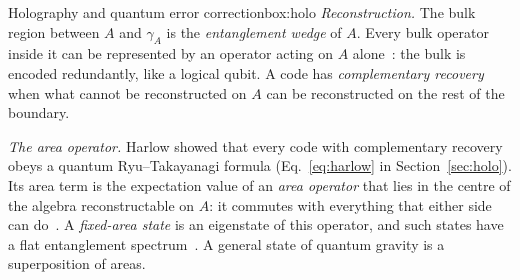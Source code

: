 \begin{primer}{Holography and quantum error correction}{box:holo}
\emph{Reconstruction.} The bulk region between $A$ and $\gamma_A$ is the \emph{entanglement wedge} of $A$. Every bulk operator inside it can
be represented by an operator acting on $A$ alone~\cite{adh,dong2016}: the bulk is encoded redundantly, like a logical qubit. A code has
\emph{complementary recovery} when what cannot be reconstructed on $A$ can be reconstructed on the rest of the boundary.

\emph{The area operator.} Harlow showed that every code with complementary recovery obeys a quantum Ryu--Takayanagi formula
(Eq.~\eqref{eq:harlow} in Section~\ref{sec:holo}). Its area term is the expectation value of an \emph{area operator} that lies in the centre
of the algebra reconstructable on $A$: it commutes with everything that either side can do~\cite{harlow}. A \emph{fixed-area state} is an
eigenstate of this operator, and such states have a flat entanglement spectrum~\cite{dhm}. A general state of quantum gravity is a
superposition of areas.
\end{primer}
